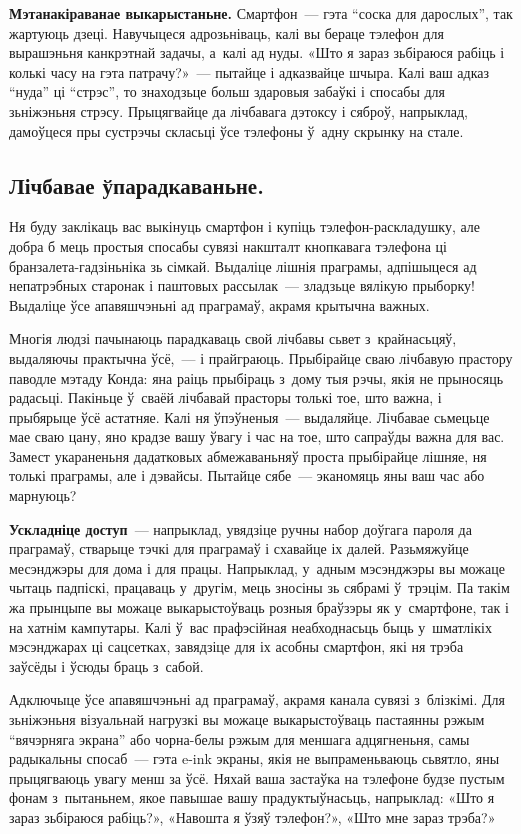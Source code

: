 \textbf{Мэтанакіраванае выкарыстаньне.} Смартфон~--- гэта ``соска для дарослых'', так жартуюць дзеці. Навучыцеся адрозьніваць, калі вы бераце тэлефон для вырашэньня канкрэтнай задачы, а~калі ад нуды. «Што я зараз зьбіраюся рабіць і колькі часу на гэта патрачу?»~--- пытайце і адказвайце шчыра. Калі ваш адказ ``нуда'' ці ``стрэс'', то знаходзьце больш здаровыя забаўкі і спосабы для зьніжэньня стрэсу. Прыцягвайце да лічбавага дэтоксу і сяброў, напрыклад, дамоўцеся пры сустрэчы скласьці ўсе тэлефоны ў~адну скрынку на стале.

\subsection*{Лічбавае ўпарадкаваньне.}

Ня буду заклікаць вас выкінуць смартфон і купіць тэлефон-раскладушку, але добра б мець простыя спосабы сувязі накшталт кнопкавага тэлефона ці бранзалета-гадзіньніка зь сімкай. Выдаліце лішнія праграмы, адпішыцеся ад непатрэбных старонак і паштовых рассылак~--- зладзьце вялікую прыборку! Выдаліце ўсе апавяшчэньні ад праграмаў, акрамя крытычна важных.

Многія людзі пачынаюць парадкаваць свой лічбавы сьвет з~крайнасьцяў, выдаляючы практычна ўсё,~--- і прайграюць. Прыбірайце сваю лічбавую прастору паводле мэтаду Конда: яна раіць прыбіраць з~дому тыя рэчы, якія не прыносяць радасьці. Пакіньце ў~сваёй лічбавай прасторы толькі тое, што важна, і прыбярыце ўсё астатняе. Калі ня ўпэўненыя~--- выдаляйце. Лічбавае сьмецьце мае сваю цану, яно крадзе вашу ўвагу і час на тое, што сапраўды важна для вас. Замест укараненьня дадатковых абмежаваньняў проста прыбірайце лішняе, ня толькі праграмы, але і дэвайсы. Пытайце сябе~--- эканомяць яны ваш час або марнуюць?

\textbf{Ускладніце доступ}~--- напрыклад, увядзіце ручны набор доўгага пароля да праграмаў, стварыце тэчкі для праграмаў і схавайце іх далей. Разьмяжуйце месэнджэры для дома і для працы. Напрыклад, у~адным мэсэнджэры вы можаце чытаць падпіскі, працаваць у~другім, мець зносіны зь сябрамі ў~трэцім. Па такім жа прынцыпе вы можаце выкарыстоўваць розныя браўзэры як у~смартфоне, так і на хатнім кампутары. Калі ў~вас прафэсійная неабходнасьць быць у~шматлікіх мэсэнджарах ці сацсетках, завядзіце для іх асобны смартфон, які ня трэба заўсёды і ўсюды браць з~сабой.

Адключыце ўсе апавяшчэньні ад праграмаў, акрамя канала сувязі з~блізкімі. Для зьніжэньня візуальнай нагрузкі вы можаце выкарыстоўваць пастаянны рэжым ``вячэрняга экрана'' або чорна-белы рэжым для меншага адцягненьня, самы радыкальны спосаб~--- гэта e-ink экраны, якія не выпраменьваюць сьвятло, яны прыцягваюць увагу менш за ўсё. Няхай ваша застаўка на тэлефоне будзе пустым фонам з~пытаньнем, якое павышае вашу прадуктыўнасьць, напрыклад: «Што я зараз зьбіраюся рабіць?», «Навошта я ўзяў тэлефон?», «Што мне зараз трэба?»

